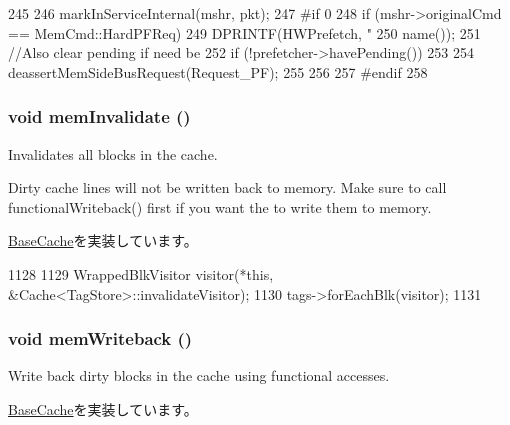 \begin{DoxyCode}
245 {
246     markInServiceInternal(mshr, pkt);
247 #if 0
248         if (mshr->originalCmd == MemCmd::HardPFReq) {
249             DPRINTF(HWPrefetch, "%
250                     name());
251             //Also clear pending if need be
252             if (!prefetcher->havePending())
253             {
254                 deassertMemSideBusRequest(Request_PF);
255             }
256         }
257 #endif
258 }
\end{DoxyCode}
\hypertarget{classCache_afea64b0aa579c17485db54c6a5c2ede3}{
\subsubsection[{memInvalidate}]{\setlength{\rightskip}{0pt plus 5cm}void memInvalidate ()}}
\label{classCache_afea64b0aa579c17485db54c6a5c2ede3}
Invalidates all blocks in the cache.

Dirty cache lines will not be written back to memory. Make sure to call functionalWriteback() first if you want the to write them to memory. 

\hyperlink{classBaseCache_aeb9356f940fbf8410f41920ee1d5864d}{BaseCache}を実装しています。


\begin{DoxyCode}
1128 {
1129     WrappedBlkVisitor visitor(*this, &Cache<TagStore>::invalidateVisitor);
1130     tags->forEachBlk(visitor);
1131 }
\end{DoxyCode}
\hypertarget{classCache_a381272ae5c2cc173adb59cd67a76b458}{
\subsubsection[{memWriteback}]{\setlength{\rightskip}{0pt plus 5cm}void memWriteback ()}}
\label{classCache_a381272ae5c2cc173adb59cd67a76b458}
Write back dirty blocks in the cache using functional accesses. 

\hyperlink{classBaseCache_afd3c83f1883488031612de6c47fcaabb}{BaseCache}を実装しています。


